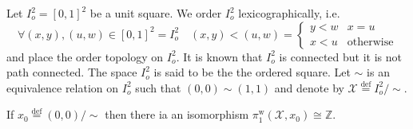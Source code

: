 \documentclass{beamer}
\theoremstyle{plain}
\newcommand{\sX}{\mathcal{X}}       %
\newcommand{\bydef}{\stackrel{\mathrm{def}}{=}}
\begin{document}
\begin{frame}
		Let $I^2_o = \left[0,1\right]^2$ be a unit square. We order $I^2_o$ lexicographically, i.e.
	$$
	\forall (x, y),(u, w) \in \left[0,1\right]^2 = I^2_o \quad (x, y)< (u, w)  = \begin{cases}
		y < w & x = u\\
		x < u & \text{otherwise}
	\end{cases}
	$$
	and place the order topology on $I^2_o$. It is known that $I^2_o$ is connected but it is not path connected.
	The space $I^2_o$ is said to be the \alert{the ordered square}.
	Let $\sim$ is an equivalence relation on  $I^2_o$ such that $\left(0, 0 \right)\sim \left(1, 1 \right)$ and denote by $\sX \bydef I^2_o/\sim$.
	\begin{lemma}
	If $x_0 \bydef \left(0, 0 \right)/\sim$ then there ia an isomorphism  $	\pi^{\text{w}}_1\left(\sX, x_0\right)\cong\mathbb{Z}$.
	\end{lemma}
\end{frame}
\end{document}
